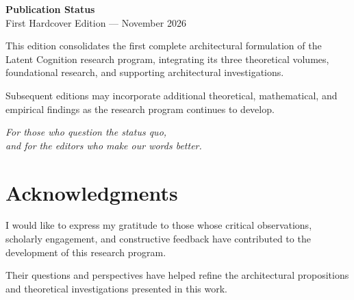 \null
\vfill

\noindent
\textbf{Publication Status}\\
First Hardcover Edition --- November 2026

\vspace{0.2in}

\noindent
This edition consolidates the first complete
architectural formulation of the Latent Cognition
research program, integrating its three
theoretical volumes, foundational research,
and supporting architectural investigations.

\vspace{\baselineskip}

\noindent
Subsequent editions may incorporate additional
theoretical, mathematical, and empirical
findings as the research program continues
to develop.

\vfill

\clearpage



\thispagestyle{empty}

\vspace*{1.5in}

\begin{center}
    \itshape
    For those who question the status quo,\\
    and for the editors who make our words better.
\end{center}

\vspace{1.2in}

\section*{Acknowledgments}

\noindent
I would like to express my gratitude to those
whose critical observations, scholarly engagement,
and constructive feedback have contributed to
the development of this research program.

Their questions and perspectives have helped
refine the architectural propositions and
theoretical investigations presented in this work.

\clearpage